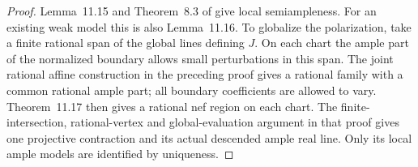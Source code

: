 \begin{proof}
Lemma~11.15 and Theorem~8.3 of \cite{FujinoAnalyticBCHM} give
local semiampleness. For an existing weak model this is also
Lemma~11.16. To globalize the polarization, take a finite rational
span of the global lines defining \(J\). On each chart the ample
part of the normalized boundary allows small perturbations in
this span. The joint rational affine construction in the preceding
proof gives a rational family with a common rational ample part;
all boundary coefficients are allowed to vary. Theorem~11.17 then
gives a rational nef region on each chart. The finite-intersection,
rational-vertex and global-evaluation argument in that proof gives
one projective contraction and its actual descended ample real
line. Only its local ample models are identified by uniqueness.
\end{proof}

